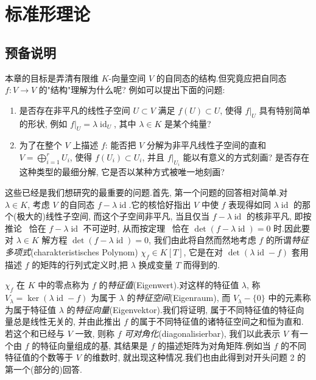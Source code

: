 \chapter{标准形理论}

\section*{预备说明}

本章的目标是弄清有限维 $K$-向量空间 $V$ 的自同态的结构.但究竟应把自同态 $f \colon V \longrightarrow V$ 的"结构"理解为什么呢? 例如可以提出下面的问题:
\begin{enumerate}
\item 是否存在非平凡的线性子空间 $U \subset V$ 满足 $f(U) \subset U$, 使得 $f|_U$ 具有特别简单的形状, 例如 $f|_U = \lambda \operatorname{id}_U$, 其中 $\lambda \in K$ 是某个纯量?
\item 为了在整个 $V$ 上描述 $f$: 能否把 $V$ 分解为非平凡线性子空间的直和 $V = \bigoplus_{i = 1}^{r} U_i$, 使得 $f(U_i) \subset U_i$, 并且 $f|_{U_i}$ 能以有意义的方式刻画? 是否存在这种类型的最细分解, 它是否以某种方式被唯一地刻画?
\end{enumerate}

这些已经是我们想研究的最重要的问题.首先, 第一个问题的回答相对简单.对 $\lambda \in K$, 考虑 $V$ 的自同态 $f - \lambda \operatorname{id}$.它的核恰好指出 $V$ 中使 $f$ 表现得如同 $\lambda \operatorname{id}$ 的那个(极大的)线性子空间, 而这个子空间非平凡, 当且仅当 $f - \lambda \operatorname{id}$ 的核非平凡, 即按推论~ 恰在 $f - \lambda \operatorname{id}$ 不可逆时, 从而按定理~ 恰在 $\det(f - \lambda \operatorname{id}) = 0$ 时.因此要对 $\lambda \in K$ 解方程 $\det(f - \lambda \operatorname{id}) = 0$, 我们由此将自然而然地考虑 $f$ 的所谓\emph{特征多项式}(\textup{charakteristisches Polynom}) $\chi_f \in K[T]$, 它是在对 $\det(\lambda \operatorname{id} - f)$ 套用描述 $f$ 的矩阵的行列式定义时,把 $\lambda$ 换成变量 $T$ 而得到的.

$\chi_f$ 在 $K$ 中的零点称为 $f$ 的\emph{特征值}(\textup{Eigenwert}).对这样的特征值 $\lambda$, 称 $V_\lambda = \ker(\lambda \operatorname{id} - f)$ 为属于 $\lambda$ 的\emph{特征空间}(\textup{Eigenraum}), 而 $V_\lambda - \{0\}$ 中的元素称为属于特征值 $\lambda$ 的\emph{特征向量}(\textup{Eigenvektor}).我们将证明, 属于不同特征值的特征向量总是线性无关的, 并由此推出 $f$ 的属于不同特征值的诸特征空间之和恒为直和.若这个和已经与 $V$ 一致, 则称 $f$ \emph{可对角化}(\textup{diagonalisierbar}), 我们以此表示 $V$ 有一个由 $f$ 的特征向量组成的基, 其结果是 $f$ 的描述矩阵为对角矩阵.例如当 $f$ 的不同特征值的个数等于 $V$ 的维数时, 就出现这种情况.我们也由此得到对开头问题 2 的第一个(部分的)回答.

